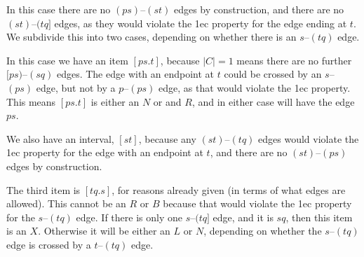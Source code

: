In this case there are no $(ps)$--$(st)$ edges by construction, and there are no $(st)$--$(tq]$ edges, as they would violate the 1ec property for the edge ending at $t$.
We subdivide this into two cases, depending on whether there is an $s$--$(tq)$ edge.

\begin{center}
\end{center}

In this case we have an item $[ps.t]$, because $|C| = 1$ means there are no further $[ps)$--$(sq)$ edges.
The edge with an endpoint at $t$ could be crossed by an $s$--$(ps)$ edge, but not by a $p$--$(ps)$ edge, as that would violate the 1ec property.
This means $[ps.t]$ is either an $N$ or and $R$, and in either case will have the edge $ps$.

We also have an interval, $[st]$, because any $(st)$--$(tq)$ edges would violate the 1ec property for the edge with an endpoint at $t$, and there are no $(st)$--$(ps)$ edges by construction.

The third item is $[tq.s]$, for reasons already given (in terms of what edges are allowed).
This cannot be an $R$ or $B$ because that would violate the 1ec property for the $s$--$(tq)$ edge.
If there is only one $s$--$(tq]$ edge, and it is $sq$, then this item is an $X$.
Otherwise it will be either an $L$ or $N$, depending on whether the $s$--$(tq)$ edge is crossed by a $t$--$(tq)$ edge.


\begin{center}
\end{center}

